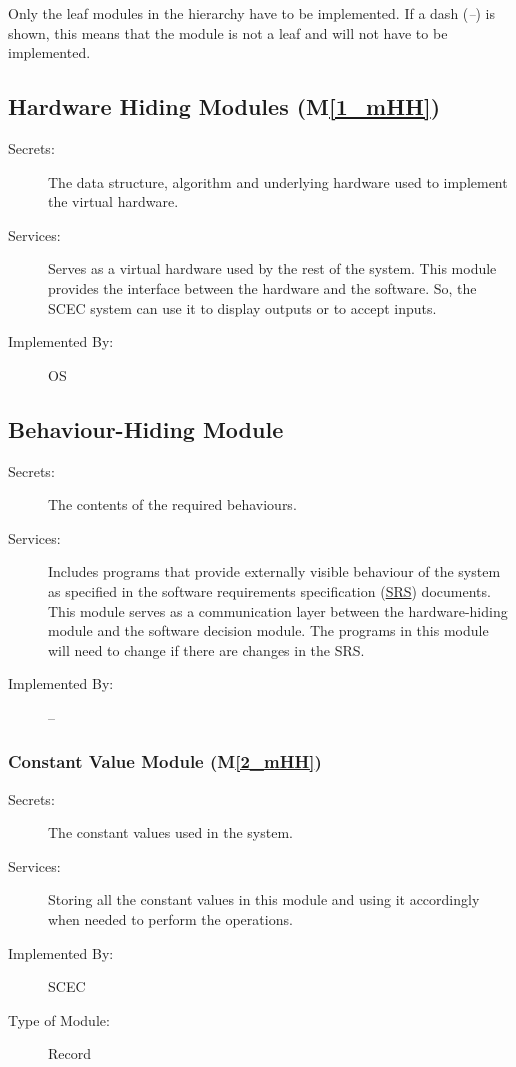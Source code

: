 \documentclass[12pt, titlepage]{article}
\newcommand{\mref}[1]{M\ref{#1}}
\begin{document}
Only the leaf modules in the hierarchy have to be implemented. If a dash
(\emph{--}) is shown, this means that the module is not a leaf and will not have
to be implemented.

\subsection{Hardware Hiding Modules (\mref{1_mHH})}

\begin{description}
\item[Secrets:]The data structure, algorithm and underlying hardware used to implement the virtual hardware.
\item[Services:]Serves as a virtual hardware used by the rest of the
  system. This module provides the interface between the hardware and the software. So, the SCEC system can use it to display outputs or to accept inputs.
\item[Implemented By:] OS
\end{description}

\subsection{Behaviour-Hiding Module}

\begin{description}
\item[Secrets:]The contents of the required behaviours.
\item[Services:]Includes programs that provide externally visible behaviour of
  the system as specified in the software requirements specification (\href{https://github.com/DeeshaPatel/CAS-741-Solar-Cooker/blob/2a6c0175891c01960d83cb99b73a762a9b2d2508/docs/SRS/SRS.pdf}{SRS})
  documents. This module serves as a communication layer between the
  hardware-hiding module and the software decision module. The programs in this
  module will need to change if there are changes in the SRS.
\item[Implemented By:] --
\end{description}

\subsubsection{Constant Value Module (\mref{2_mHH})}

\begin{description}
\item[Secrets:] The constant values used in the system. 
\item[Services:] Storing all the constant values in this module and using it accordingly when needed to perform the operations. 
\item[Implemented By:] SCEC
\item[Type of Module:] Record
\end{description}
\end{document}
